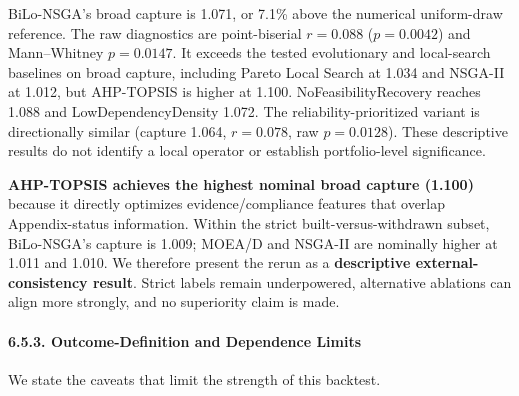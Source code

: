 \documentclass[
]{article}
\begin{document}
BiLo-NSGA's broad capture is 1.071, or 7.1\% above the numerical uniform-draw reference. The raw diagnostics are point-biserial \(r=0.088\) (\(p=0.0042\)) and Mann--Whitney \(p=0.0147\). It exceeds the tested evolutionary and local-search baselines on broad capture, including Pareto Local Search at 1.034 and NSGA-II at 1.012, but AHP-TOPSIS is higher at 1.100. NoFeasibilityRecovery reaches 1.088 and LowDependencyDensity 1.072. The reliability-prioritized variant is directionally similar (capture 1.064, \(r=0.078\), raw \(p=0.0128\)). These descriptive results do not identify a local operator or establish portfolio-level significance.

\textbf{AHP-TOPSIS achieves the highest nominal broad capture (1.100)} because it directly optimizes evidence/compliance features that overlap Appendix-status information. Within the strict built-versus-withdrawn subset, BiLo-NSGA's capture is 1.009; MOEA/D and NSGA-II are nominally higher at 1.011 and 1.010. We therefore present the rerun as a \textbf{descriptive external-consistency result}. Strict labels remain underpowered, alternative ablations can align more strongly, and no superiority claim is made.

\paragraph{6.5.3. Outcome-Definition and Dependence Limits}\label{outcome-definition-and-dependence-limits}

We state the caveats that limit the strength of this backtest.
\end{document}
